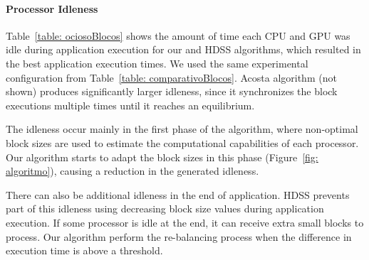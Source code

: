 \documentclass[journal]{IEEEtran}
\begin{document}
\paragraph{Processor Idleness} Table~\ref{table: ociosoBlocos} shows the amount of time each CPU and GPU was
idle during application execution for our and HDSS algorithms, which resulted in
the best application execution times. We used the same experimental
configuration from Table~\ref{table: comparativoBlocos}. Acosta algorithm (not
shown) produces significantly larger idleness, since it synchronizes the block
executions multiple times until it reaches an equilibrium.

The idleness occur mainly in the first phase of the algorithm, where
non-optimal block sizes are used to estimate the computational capabilities of
each processor. Our algorithm starts to adapt the block sizes in this phase
(Figure~\ref{fig: algoritmo}), causing a reduction in the generated idleness.

There can also be additional idleness in the end of application. HDSS prevents
part of this idleness using decreasing block size values during application
execution. If some processor is idle at the end, it can receive extra small
blocks to process. Our algorithm perform the re-balancing process when the
difference in execution time is above a threshold.




%	
\end{document}
